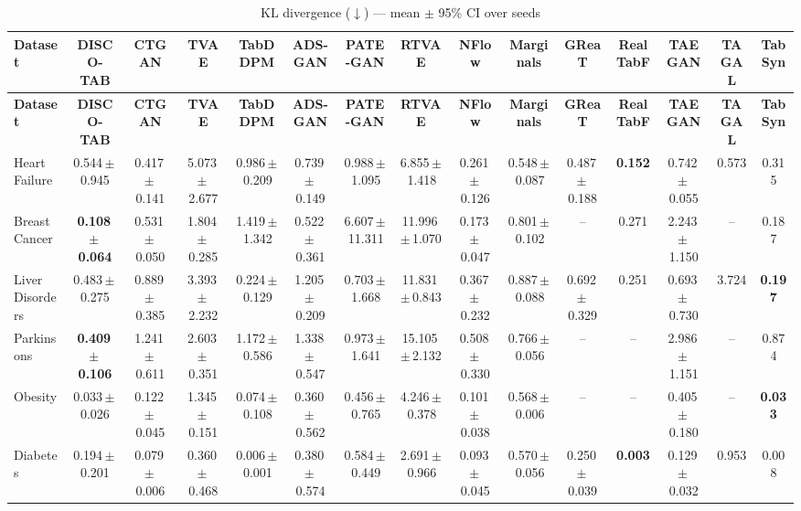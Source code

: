 \documentclass[8pt]{extarticle}
\begin{document}
\begin{longtable}{l*{14}{c}}
\caption{KL divergence ($\downarrow$) --- mean $\pm$ 95\% CI over seeds}\\
\toprule
\textbf{Dataset} & \textbf{DISCO-TAB} & \textbf{CTGAN} & \textbf{TVAE} & \textbf{TabDDPM} & \textbf{ADS-GAN} & \textbf{PATE-GAN} & \textbf{RTVAE} & \textbf{NFlow} & \textbf{Marginals} & \textbf{GReaT} & \textbf{RealTabF} & \textbf{TAEGAN} & \textbf{TAGAL} & \textbf{TabSyn} \\
\midrule
\endfirsthead
\toprule
\textbf{Dataset} & \textbf{DISCO-TAB} & \textbf{CTGAN} & \textbf{TVAE} & \textbf{TabDDPM} & \textbf{ADS-GAN} & \textbf{PATE-GAN} & \textbf{RTVAE} & \textbf{NFlow} & \textbf{Marginals} & \textbf{GReaT} & \textbf{RealTabF} & \textbf{TAEGAN} & \textbf{TAGAL} & \textbf{TabSyn} \\
\midrule
\endhead
\bottomrule
\endfoot
Heart Failure & 0.544\,$\pm$\,0.945 & 0.417\,$\pm$\,0.141 & 5.073\,$\pm$\,2.677 & 0.986\,$\pm$\,0.209 & 0.739\,$\pm$\,0.149 & 0.988\,$\pm$\,1.095 & 6.855\,$\pm$\,1.418 & 0.261\,$\pm$\,0.126 & 0.548\,$\pm$\,0.087 & 0.487\,$\pm$\,0.188 & \textbf{0.152} & 0.742\,$\pm$\,0.055 & 0.573 & 0.315 \\
Breast Cancer & \textbf{0.108\,$\pm$\,0.064} & 0.531\,$\pm$\,0.050 & 1.804\,$\pm$\,0.285 & 1.419\,$\pm$\,1.342 & 0.522\,$\pm$\,0.361 & 6.607\,$\pm$\,11.311 & 11.996\,$\pm$\,1.070 & 0.173\,$\pm$\,0.047 & 0.801\,$\pm$\,0.102 & -- & 0.271 & 2.243\,$\pm$\,1.150 & -- & 0.187 \\
Liver Disorders & 0.483\,$\pm$\,0.275 & 0.889\,$\pm$\,0.385 & 3.393\,$\pm$\,2.232 & 0.224\,$\pm$\,0.129 & 1.205\,$\pm$\,0.209 & 0.703\,$\pm$\,1.668 & 11.831\,$\pm$\,0.843 & 0.367\,$\pm$\,0.232 & 0.887\,$\pm$\,0.088 & 0.692\,$\pm$\,0.329 & 0.251 & 0.693\,$\pm$\,0.730 & 3.724 & \textbf{0.197} \\
Parkinsons & \textbf{0.409\,$\pm$\,0.106} & 1.241\,$\pm$\,0.611 & 2.603\,$\pm$\,0.351 & 1.172\,$\pm$\,0.586 & 1.338\,$\pm$\,0.547 & 0.973\,$\pm$\,1.641 & 15.105\,$\pm$\,2.132 & 0.508\,$\pm$\,0.330 & 0.766\,$\pm$\,0.056 & -- & -- & 2.986\,$\pm$\,1.151 & -- & 0.874 \\
Obesity & 0.033\,$\pm$\,0.026 & 0.122\,$\pm$\,0.045 & 1.345\,$\pm$\,0.151 & 0.074\,$\pm$\,0.108 & 0.360\,$\pm$\,0.562 & 0.456\,$\pm$\,0.765 & 4.246\,$\pm$\,0.378 & 0.101\,$\pm$\,0.038 & 0.568\,$\pm$\,0.006 & -- & -- & 0.405\,$\pm$\,0.180 & -- & \textbf{0.033} \\
Diabetes & 0.194\,$\pm$\,0.201 & 0.079\,$\pm$\,0.006 & 0.360\,$\pm$\,0.468 & 0.006\,$\pm$\,0.001 & 0.380\,$\pm$\,0.574 & 0.584\,$\pm$\,0.449 & 2.691\,$\pm$\,0.966 & 0.093\,$\pm$\,0.045 & 0.570\,$\pm$\,0.056 & 0.250\,$\pm$\,0.039 & \textbf{0.003} & 0.129\,$\pm$\,0.032 & 0.953 & 0.008 \\

\end{longtable}
\end{document}
